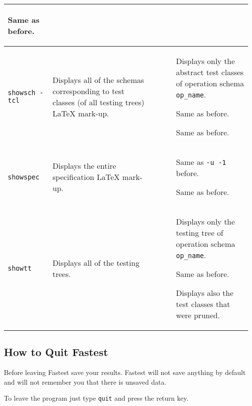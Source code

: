 \begin{longtable}{|p{3.3cm}|p{7cm}|p{6.3cm}|}
\begin{description}
Same as before.
\end{description}\\\hline

\verb+showsch -tcl+ & Displays all of the schemas corresponding to test classes (of all testing trees) \LaTeX{} mark-up. & 
\begin{description}
\item[{\tt [-p <op\_name>]}]\mbox{}

Displays only the abstract test classes of operation schema \verb+op_name+.

\item[{\tt [-u <unfold\_order>]}]\mbox{}

Same as before.

\item[{\tt [-o <file\_name>]}]\mbox{}

Same as before.
\end{description}\\\hline

\verb+showspec+ & Displays the entire specification \LaTeX{} mark-up. &
\begin{description}
\item[{\tt [-u]}]\mbox{}

Same as \verb+-u -1+ before.

\item[{\tt [-o <file\_name>]}]\mbox{}

Same as before.
\end{description}\\\hline


\verb+showtt+ & Displays all of the testing trees. &
\begin{description}
\item[{\tt [-p <op\_name>]}]\mbox{}

Displays only the testing tree of operation schema \verb+op_name+.

\item[{\tt [-o <file\_name>]}]\mbox{}

Same as before.

\item[{\tt [-x]}]

Displays also the test classes that were pruned.
\end{description}\\\hline
\end{longtable}


\subsection{\label{quit}How to Quit Fastest}

\vspace{5mm} Before leaving Fastest save your results. Fastest will not save anything by default and will not remember you that there is unsaved data.\vspace{5mm}

To leave the program just type \verb+quit+ and press the return key.
